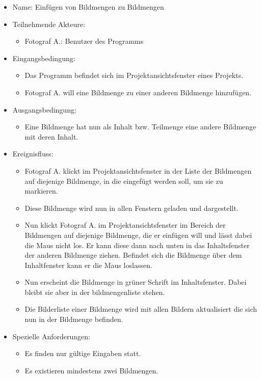 	\begin{itemize}
		\item Name: Einfügen von Bildmengen zu Bildmengen
		\item Teilnehmende Akteure:
		\begin{itemize}
			\item	Fotograf A.: Benutzer des Programms		
		\end{itemize}
		\item Eingangsbedingung:
		\begin{itemize}
			\item	Das Programm befindet sich im Projektansichtsfenster eines Projekts.
			\item Fotograf A. will eine Bildmenge zu einer anderen Bildmenge hinzufügen.
		\end{itemize}
		\item Ausgangsbedingung:
		\begin{itemize}
			\item	Eine Bildmenge hat nun als Inhalt bzw. Teilmenge eine andere Bildmenge mit deren Inhalt. 	
		\end{itemize}
		\item Ereignisfluss:
		\begin{itemize}
			\item Fotograf A. klickt im Projektansichtsfenster in der Liste der Bildmengen auf diejenige Bildmenge, in die eingefügt werden soll, um sie zu markieren.
			\item Diese Bildmenge wird nun in allen Fenstern geladen und dargestellt.
			\item Nun klickt Fotograf A. im Projektansichtsfenster im Bereich der Bildmengen auf diejenige Bildmenge, die er einfügen will und lässt dabei die Maus nicht los. Er kann diese dann nach unten in das Inhaltsfenster der anderen Bildmenge ziehen. Befindet sich die Bildmenge über dem Inhaltfenster kann er die Maus loslassen.
			\item Nun erscheint die Bildmenge in grüner Schrift im Inhaltsfenster. Dabei bleibt sie aber in der bildmengenliste stehen.
			\item Die Bilderliste einer Bildmenge wird mit allen Bildern aktualisiert die sich nun in der Bildmenge befinden.
		\end{itemize}
		\item Spezielle Anforderungen:
		\begin{itemize}
			\item	Es finden nur gültige Eingaben statt.
			\item Es existieren mindestens zwei Bildmengen.
		\end{itemize}			
	\end{itemize}
	
